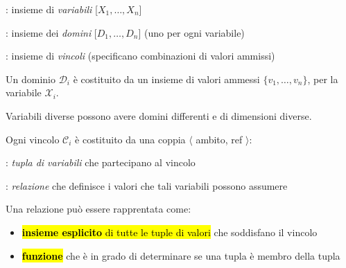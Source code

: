 \documentclass[12pt, a4paper, oneside]{book}
\begin{document}
    \begin{description}[labelindent=0.5cm]
      \item[$\mathcal{X}$]: insieme di \textit{variabili} [$X_1, \dots, X_n$]
      \item[$\mathcal{D}$]: insieme dei \textit{domini} [$D_1, \dots, D_n$] (uno per ogni variabile)
      \item [$\mathcal{C}$]: insieme di \textit{vincoli} (specificano combinazioni di valori ammissi) 
    \end{description}

    Un dominio $\mathcal{D}_i$ è costituito da un insieme di valori ammessi $\{v_1, \dots, v_n\}$, per la variabile $\mathcal{X}_i$.


    Variabili diverse possono avere domini differenti e di dimensioni diverse.

    Ogni vincolo $\mathcal{C}_i$ è costituito da una coppia $\langle$ ambito, ref $\rangle$:
    \begin{description}[labelindent=0.5cm]
      \item [ambito]: \textit{tupla di variabili} che partecipano al vincolo
      \item [ref]: \textit{relazione} che definisce i valori che tali variabili possono assumere  
    \end{description}

    Una relazione può essere rapprentata come:
    \begin{itemize}
      \item \hl{\textbf{insieme esplicito} di tutte le tuple di valori} che soddisfano il vincolo
      \item \hl{\textbf{funzione}} che è in grado di determinare se una tupla è membro della tupla 
    \end{itemize}

\end{document}
